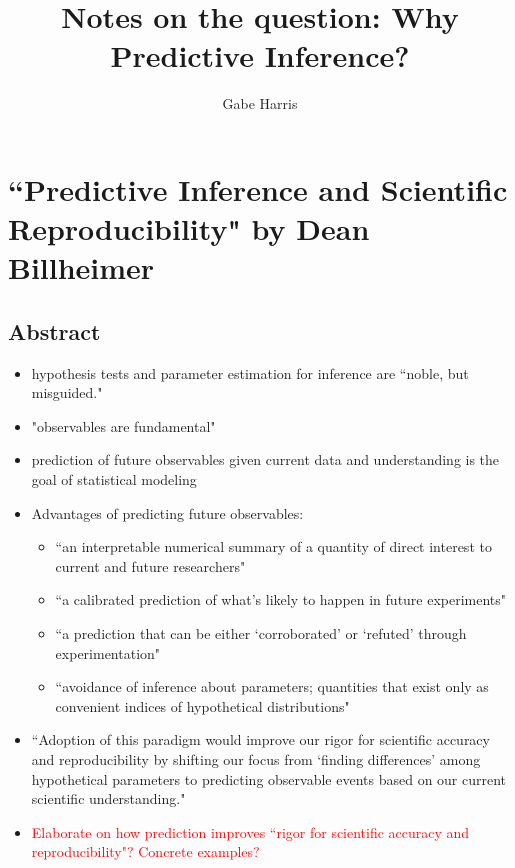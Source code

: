 \documentclass[12pt, a4paper]{article}
\begin{document}
% 
% 





\title{Notes on the question:  Why Predictive Inference?}
\author{\Large Gabe Harris}
\maketitle

\section{``Predictive Inference and Scientific Reproducibility" by Dean Billheimer}

\subsection{Abstract}

\begin{itemize}
  \item hypothesis tests and parameter estimation for inference are ``noble, but misguided."
  \item "observables are fundamental"
  \item prediction of future observables given current data and understanding is the goal of statistical modeling
  \item Advantages of predicting future observables:
    \begin{itemize}
      \item ``an interpretable numerical summary of a quantity of direct interest to current and future researchers"
      \item ``a calibrated prediction of what's likely to happen in future experiments"
      \item ``a prediction that can be either `corroborated' or `refuted' through experimentation"
      \item ``avoidance of inference about parameters; quantities that exist only as convenient indices of hypothetical distributions"
    \end{itemize}
  \item ``Adoption of this paradigm would improve our rigor for scientific accuracy and reproducibility by shifting our focus from `finding differences' among hypothetical parameters to predicting observable events based on our current scientific understanding."
  \item \textcolor{red}{Elaborate on how prediction improves ``rigor for scientific accuracy and reproducibility"?  Concrete examples?}
\end{itemize}
\end{document}
